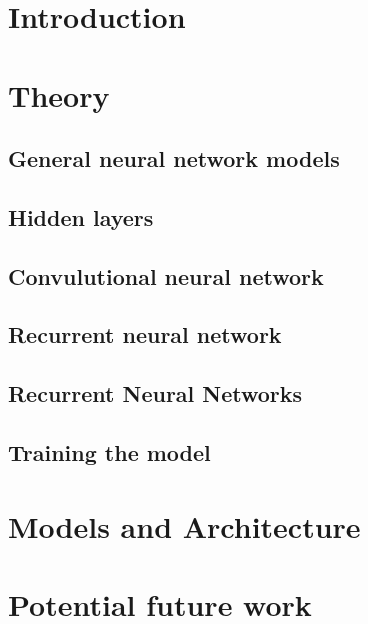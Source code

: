 \documentclass[a4paper]{article}
\begin{document}
\maketitle

\newpage
\tableofcontents
\newpage

\section{Introduction}


\section{Theory}
\subsection{General neural network models}


\subsection{Hidden layers}


\subsection{Convulutional neural network}



\subsection{Recurrent neural network}



\subsection{Recurrent Neural Networks}


\subsection{Training the model}



\section{Models and Architecture}


\section{Potential future work}


{}

\end{document}
